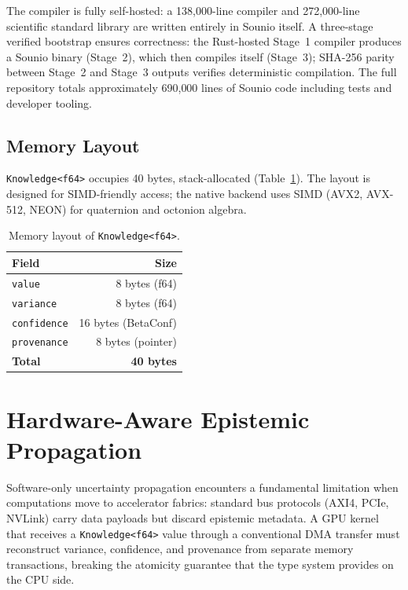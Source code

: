 \documentclass[journal]{IEEEtran}
\begin{document}
The compiler is fully self-hosted: a 138{,}000-line compiler and
272{,}000-line scientific standard library are written entirely in Sounio
itself. A three-stage verified bootstrap ensures correctness: the Rust-hosted
Stage~1 compiler produces a Sounio binary (Stage~2), which then compiles
itself (Stage~3); SHA-256 parity between Stage~2 and Stage~3 outputs
verifies deterministic compilation. The full repository totals approximately
690{,}000 lines of Sounio code including tests and developer tooling.

\subsection{Memory Layout}

\texttt{Knowledge<f64>} occupies 40 bytes, stack-allocated
(Table~\ref{tab:layout}). The layout is designed for SIMD-friendly
access; the native backend uses SIMD (AVX2, AVX-512, NEON) for
quaternion and octonion algebra.

\begin{table}[!t]
\caption{Memory layout of \texttt{Knowledge<f64>}.}
\label{tab:layout}
\centering
\begin{tabular}{lr}
\toprule
Field & Size \\
\midrule
\texttt{value} & 8 bytes (f64) \\
\texttt{variance} & 8 bytes (f64) \\
\texttt{confidence} & 16 bytes (BetaConf) \\
\texttt{provenance} & 8 bytes (pointer) \\
\midrule
\textbf{Total} & \textbf{40 bytes} \\
\bottomrule
\end{tabular}
\end{table}

\section{Hardware-Aware Epistemic Propagation}
\label{sec:hardware}

Software-only uncertainty propagation encounters a fundamental limitation
when computations move to accelerator fabrics: standard bus protocols
(AXI4, PCIe, NVLink) carry data payloads but discard epistemic metadata.
A GPU kernel that receives a \texttt{Knowledge<f64>} value through a
conventional DMA transfer must reconstruct variance, confidence, and
provenance from separate memory transactions, breaking the atomicity
guarantee that the type system provides on the CPU side.
\end{document}
